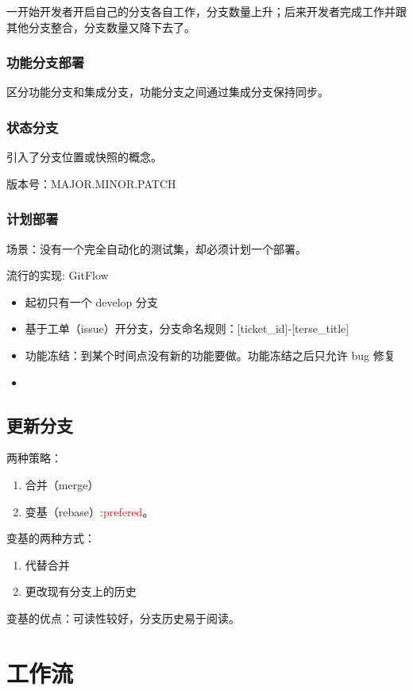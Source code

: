 \documentclass[cn,pad,11pt,green,geye]{../elegantnote}
\begin{document}
一开始开发者开启自己的分支各自工作，分支数量上升；后来开发者完成工作并跟其他分支整合，分支数量又降下去了。

\subsubsection{功能分支部署}
区分功能分支和集成分支，功能分支之间通过集成分支保持同步。

\subsubsection{状态分支}
引入了分支位置或快照的概念。

版本号：MAJOR.MINOR.PATCH

\subsubsection{计划部署}
场景：没有一个完全自动化的测试集，却必须计划一个部署。

流行的实现: GitFlow
\begin{itemize}
   \item 起初只有一个 develop 分支
   \item 基于工单（issue）开分支，分支命名规则：[ticket\_id]-[terse\_title]
   \item 功能冻结：到某个时间点没有新的功能要做。功能冻结之后只允许 bug 修复
   \item 
\end{itemize}

\subsection{更新分支}

两种策略：
\begin{enumerate}
   \item 合并（merge）
   \item 变基（rebase）:\textcolor{red}{prefered}。
\end{enumerate}

变基的两种方式：
\begin{enumerate}
   \item 代替合并
   \item 更改现有分支上的历史
\end{enumerate}

变基的优点：可读性较好，分支历史易于阅读。

\section{工作流}
\end{document}
